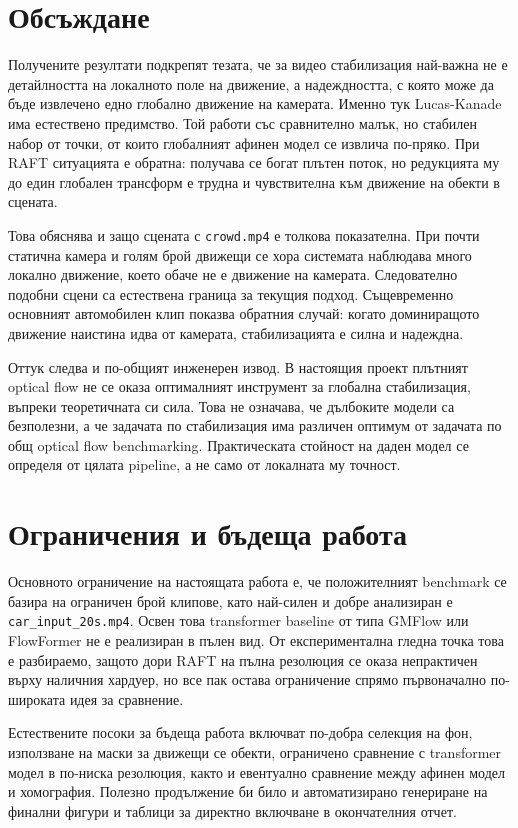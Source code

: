 \documentclass[12pt,a4paper]{article}
\begin{document}
\section{Обсъждане}
Получените резултати подкрепят тезата, че за видео стабилизация най-важна не е детайлността на локалното поле на движение, а надеждността, с която може да бъде извлечено едно глобално движение на камерата. Именно тук Lucas-Kanade има естествено предимство. Той работи със сравнително малък, но стабилен набор от точки, от които глобалният афинен модел се извлича по-пряко. При RAFT ситуацията е обратна: получава се богат плътен поток, но редукцията му до един глобален трансформ е трудна и чувствителна към движение на обекти в сцената.

Това обяснява и защо сцената с \texttt{crowd.mp4} е толкова показателна. При почти статична камера и голям брой движещи се хора системата наблюдава много локално движение, което обаче не е движение на камерата. Следователно подобни сцени са естествена граница за текущия подход. Същевременно основният автомобилен клип показва обратния случай: когато доминиращото движение наистина идва от камерата, стабилизацията е силна и надеждна.

Оттук следва и по-общият инженерен извод. В настоящия проект плътният optical flow не се оказа оптималният инструмент за глобална стабилизация, въпреки теоретичната си сила. Това не означава, че дълбоките модели са безполезни, а че задачата по стабилизация има различен оптимум от задачата по общ optical flow benchmarking. Практическата стойност на даден модел се определя от цялата pipeline, а не само от локалната му точност.

\section{Ограничения и бъдеща работа}
Основното ограничение на настоящата работа е, че положителният benchmark се базира на ограничен брой клипове, като най-силен и добре анализиран е \texttt{car\_input\_20s.mp4}. Освен това transformer baseline от типа GMFlow или FlowFormer не е реализиран в пълен вид. От експериментална гледна точка това е разбираемо, защото дори RAFT на пълна резолюция се оказа непрактичен върху наличния хардуер, но все пак остава ограничение спрямо първоначално по-широката идея за сравнение.

Естествените посоки за бъдеща работа включват по-добра селекция на фон, използване на маски за движещи се обекти, ограничено сравнение с transformer модел в по-ниска резолюция, както и евентуално сравнение между афинен модел и хомография. Полезно продължение би било и автоматизирано генериране на финални фигури и таблици за директно включване в окончателния отчет.
\end{document}
